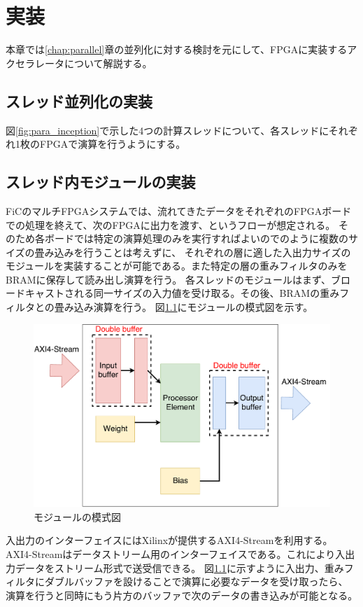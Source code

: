 \chapter{実装}
{
\label{chap:implement}
本章では\ref{chap:parallel}章の並列化に対する検討を元にして、FPGAに実装するアクセラレータについて解説する。
\section{スレッド並列化の実装}
\label{sec:thread_impl}
図\ref{fig:para_inception}で示した4つの計算スレッドについて、各スレッドにそれぞれ1枚のFPGAで演算を行うようにする。

\section{スレッド内モジュールの実装}
\label{sec:module_impl}
FiCのマルチFPGAシステムでは、流れてきたデータをそれぞれのFPGAボードでの処理を終えて、次のFPGAに出力を渡す、というフローが想定される。
そのため各ボードでは特定の演算処理のみを実行すればよいので\cite{optimized}のように複数のサイズの畳み込みを行うことは考えずに、
それぞれの層に適した入出力サイズのモジュールを実装することが可能である。また特定の層の重みフィルタのみをBRAMに保存して読み出し演算を行う。
各スレッドのモジュールはまず、ブロードキャストされる同一サイズの入力値を受け取る。その後、BRAMの重みフィルタとの畳み込み演算を行う。
図\ref{fig:thread_module}にモジュールの模式図を示す。
\begin{figure}[h]
    \centering
    \includegraphics[width=12cm]{./chap6/fig/thread_module.pdf}
    \caption{モジュールの模式図}
    \label{fig:thread_module}
\end{figure}
入出力のインターフェイスにはXilinxが提供するAXI4-Streamを利用する。
AXI4-Streamはデータストリーム用のインターフェイスである。これにより入出力データをストリーム形式で送受信できる。
図\ref{fig:thread_module}に示すように入出力、重みフィルタにダブルバッファを設けることで演算に必要なデータを受け取ったら、
演算を行うと同時にもう片方のバッファで次のデータの書き込みが可能となる。

}
